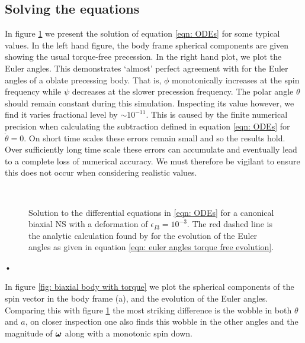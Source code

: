 \documentclass[../full_thesis/full_thesis.tex]{subfiles}
\begin{document}
\subsection{Solving the equations}
In figure \ref{fig: biaxial body no torque} we present the solution of equation
\eqref{eqn: ODEs} for some typical values. In the left hand figure, the body
frame spherical components are given showing the usual torque-free precession.
In the right hand plot, we plot the Euler angles. This demonstrates `almost'
perfect agreement with \citet{Jones2001} for the Euler angles of a oblate
precessing body. That is, $\phi$ monotonically increases at the spin frequency
while $\psi$ decreases at the slower precession frequency. The polar angle
$\theta$ should remain constant during this simulation. Inspecting its value
however, we find it varies fractional level by $\sim 10^{-11}$.
This is caused by the finite numerical precision when calculating the
subtraction defined in equation \eqref{eqn: ODEs} for $\dot{\theta}=0$. On
short time scales these errors remain small and so
the results hold.  Over sufficiently long time scale these errors can
accumulate and eventually lead to a complete loss of numerical accuracy. We
must therefore be vigilant to ensure this does not occur when considering
realistic values.
\begin{figure}[htb]
    \centering
{} \\
\caption{Solution to the differential equations in \eqref{eqn: ODEs} for a
canonical biaxial NS with a deformation of $\epsilon_{I3} = 10^{-3}$. The red
dashed line is the analytic calculation found by \citet{Jones2001} for the
evolution of the Euler angles as given in equation
\eqref{eqn: euler angles torque free evolution}.}
\label{fig: biaxial body no torque}
\end{figure}•

In figure \ref{fig: biaxial body with torque} we plot the spherical components
of the spin vector in the body frame (a), and the evolution of the Euler
angles. Comparing this with figure \ref{fig: biaxial body no torque} the most
striking difference is the wobble in both $\theta$ and $a$, on closer
inspection one also finds this wobble in the other angles and the magnitude of
$\boldsymbol{\omega}$ along with a monotonic spin down.
\end{document}
